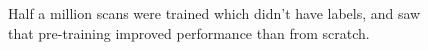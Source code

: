 \documentclass[11pt]{article}
\begin{document}
\begin{figure}[H]
    \centering
    \caption*{Half a million scans were trained which didn't have labels, and saw that pre-training improved performance than from scratch.}
\end{figure}

\printbibliography
{}
\end{document}

